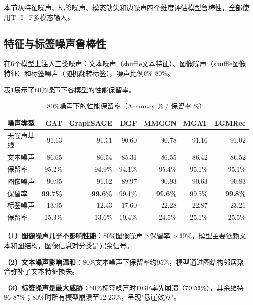 本节从特征噪声、标签噪声、模态缺失和边噪声四个维度评估模型鲁棒性，全部使用T+I+F多模态输入。

\subsection{特征与标签噪声鲁棒性}

在6个模型上注入三类噪声：文本噪声（shuffle文本特征）、图像噪声（shuffle图像特征）和标签噪声（随机翻转标签），噪声比例0\%-80\%。

表\ref{tab:noise_retention}展示了80\%噪声下各模型的性能保留率。

\begin{table}[htbp]
  \centering
  \caption{80\%噪声下的性能保留率（Accuracy \% / 保留率 \%）\protect\footnotemark}
  \label{tab:noise_retention}
  \begin{tabular}{lrrrrrr}
    \toprule
    噪声类型 & GAT & GraphSAGE & DGF & MMGCN & MGAT & LGMRec \\
    \midrule
    无噪声基线 & 91.13 & 91.31 & 90.60 & 90.78 & 91.16 & 91.02 \\
    \midrule
    文本噪声 & 86.65 & 86.54 & 85.31 & 86.55 & 86.42 & 86.52 \\
    保留率 & 95.2\% & 94.9\% & 94.1\% & 95.4\% & 95.1\% & 95.1\% \\
    \midrule
    图像噪声 & 90.95 & 91.02 & 89.97 & 90.93 & 90.63 & 90.83 \\
    保留率 & \textbf{99.7\%} & \textbf{99.6\%} & 99.1\% & \textbf{99.6\%} & 99.5\% & \textbf{99.8\%} \\
    \midrule
    标签噪声 & 13.95 & 12.43 & 17.60 & 22.28 & 22.87 & 23.21 \\
    保留率 & 15.3\% & 13.6\% & 19.4\% & 24.5\% & 25.1\% & 25.5\% \\
    \bottomrule
  \end{tabular}
\end{table}


\textbf{（1）图像噪声几乎不影响性能}：80\%图像噪声下保留率$>$99\%，模型主要依赖文本和图结构，图像信息对分类是冗余信号。

\textbf{（2）文本噪声影响温和}：80\%文本噪声下保留率约95\%，模型通过图结构邻居聚合弥补了文本特征损失。

\textbf{（3）标签噪声是最大威胁}：60\%标签噪声时DGF率先崩溃（70.59\%），其余维持86-87\%；80\%时所有模型崩溃至12-23\%，呈现"悬崖效应"。


